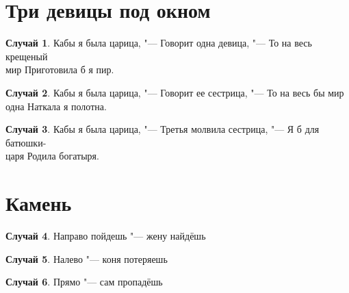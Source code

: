 \documentclass[a4paper]{article}
\theoremstyle{definition}
\newtheorem{case}{Случай}
\begin{document}
\section{Три девицы под окном}
\begin{case} Кабы я была царица, "---
Говорит одна девица, "---
То на весь крещеный\\ мир
Приготовила б я пир.
\end{case}

\begin{case}
Кабы я была царица, "---
Говорит ее сестрица, "---
То на весь бы мир\\ одна
Наткала я полотна.
\end{case}

\begin{case}
Кабы я была царица, "---
Третья молвила сестрица, "---
Я б для батюшки-\\ царя
Родила богатыря.
\end{case}

\section{Камень}
\begin{case}
Направо пойдешь "--- жену найдёшь
\end{case}

\begin{case}
Налево "--- коня потеряешь
\end{case}

\begin{case}
Прямо "--- сам пропадёшь
\end{case}
\end{document}

